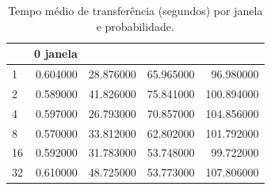 \begin{table}
\caption{Tempo médio de transferência (segundos) por janela e probabilidade.}
\label{tab:tempo}
\begin{tabular}{lrrrr}
\toprule
 & 0%
janela &  &  &  &  \\
\midrule
1 & 0.604000 & 28.876000 & 65.965000 & 96.980000 \\
2 & 0.589000 & 41.826000 & 75.841000 & 100.894000 \\
4 & 0.597000 & 26.793000 & 70.857000 & 104.856000 \\
8 & 0.570000 & 33.812000 & 62.802000 & 101.792000 \\
16 & 0.592000 & 31.783000 & 53.748000 & 99.722000 \\
32 & 0.610000 & 48.725000 & 53.773000 & 107.806000 \\
\bottomrule
\end{tabular}
\end{table}
